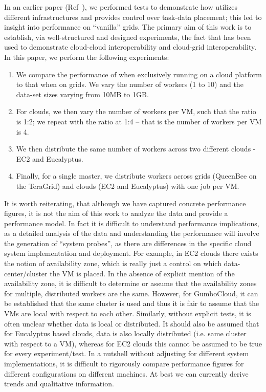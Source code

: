 \documentclass[3p,twocolumn]{elsarticle}
\begin{document}
In an earlier paper (Ref~\cite{saga_ccgrid09}), we performed tests to
demonstrate how \sagamapreduce utilizes different infrastructures and
provides control over task-data placement; this led to insight into
performance on ``vanilla'' grids. The primary aim of this work is to
establish, via well-structured and designed experiments, the fact that
\sagamapreduce has been used to demonstrate cloud-cloud
interoperability and cloud-grid interoperability. In this paper, we
perform the following experiments:
\begin{enumerate}
\item We compare the performance of \sagamapreduce when exclusively
  running on a cloud platform to that when on grids. We vary the
  number of workers (1 to 10) and the data-set sizes varying from 10MB
  to 1GB.
\item For clouds, we then vary the number of workers per VM, such that
  the ratio is 1:2; we repeat with the ratio at 1:4 -- that is the
  number of workers per VM is 4.
\item We then distribute the same number of workers across two
  different clouds - EC2 and Eucalyptus.
\item Finally, for a single master, we distribute workers across grids
  (QueenBee on the TeraGrid) and clouds (EC2 and Eucalyptus) with one job
  per VM.
\end{enumerate}
It is worth reiterating, that although we have captured concrete
performance figures, it is not the aim of this work to analyze the
data and provide a performance model. In fact it is difficult to
understand performance implications, as a detailed analysis of the
data and understanding the performance will involve the generation of
``system probes'', as there are differences in the specific cloud
system implementation and deployment.  For example, in EC2 clouds %
there exists the notion of availability zone, which is really just a
control on which data-center/cluster the VM is placed. In the absence
of explicit mention of the availability zone, it is difficult to
determine or assume that the availability zones for multiple,
distributed workers are the same. However, for GumboCloud, it can be
established that the same cluster is used and thus it is fair to
assume that the VMs are local with respect to each other.  Similarly,
without explicit tests, it is often unclear whether data is local or
distributed.  It should also be assumed that for Eucalyptus based
clouds, data is also locally distributed (i.e.  same cluster with
respect to a VM), whereas for EC2 clouds this cannot be assumed to be
true for every experiment/test. In a nutshell without adjusting for
different system implementations, it is difficult to rigorously
compare performance figures for different configurations on different
machines. At best we can currently derive trends and qualitative
information.
\end{document}
